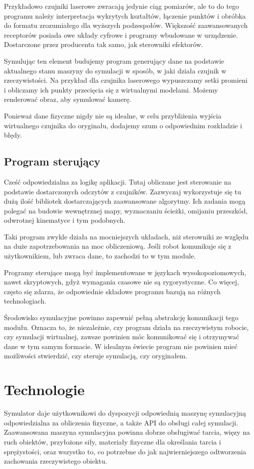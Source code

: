 	Przykładowo czujniki laserowe zwracają jedynie ciąg pomiarów, ale to do tego programu należy interpretacja wykrytych kształtów, łączenie punktów i obróbka do formatu zrozumiałego dla wyższych podzespołów.
	Większość zaawansowanych receptorów posiada owe układy cyfrowe i programy wbudowane w urządzenie.
	Dostarczone przez producenta tak samo, jak sterowniki efektorów.
	
	Symulując ten element budujemy program generujący dane na podstawie aktualnego stanu maszyny do symulacji w sposób, w jaki działa czujnik w rzeczywistości.
	Na przykład dla czujnika laserowego wypuszczamy setki promieni i obliczamy ich punkty przecięcia się z wirtualnymi modelami.
	Możemy renderować obraz, aby symulować kamerę.

	Ponieważ dane fizyczne nigdy nie są idealne, w celu przybliżenia wyjścia wirtualnego czujnika do oryginału, dodajemy szum o odpowiednim rozkładzie i błędy.

	\subsection{Program sterujący}
	Cześć odpowiedzialna za logikę aplikacji. Tutaj obliczane jest sterowanie na podstawie dostarczonych odczytów z czujników.
	Zazwyczaj wykorzystuje się tu dużą ilość bibliotek dostarczających zaawansowane algorytmy.
	Ich zadania mogą polegać na budowie wewnętrznej mapy, wyznaczaniu ścieżki, omijaniu przeszkód, odwrotnej kinematyce i tym podobnych.

	Taki program zwykle działa na mocniejszych układach, niż sterowniki ze względu na duże zapotrzebowania na moc obliczeniową.
	Jeśli robot komunikuje się z użytkownikiem, lub zwraca dane, to zachodzi to w tym module. 

	Programy sterujące mogą być implementowane w językach wysokopoziomowych, nawet skryptowych, gdyż wymagania czasowe nie są rygorystyczne.
	Co więcej, często się zdarza, że odpowiednie składowe programu bazują na różnych technologiach.

	Środowisko symulacyjne powinno zapewnić pełną abstrakcję komunikacji tego modułu.
	Oznacza to, że niezależnie, czy program działa na rzeczywistym robocie, czy symulacji wirtualnej, zawsze powinien móc komunikować się i otrzymywać dane w tym samym formacie.
	W idealnym świecie program nie powinien mieć możliwości stwierdzić, czy steruje symulacją, czy oryginałem.

\section{Technologie}
	Symulator daje użytkownikowi do dyspozycji odpowiednią maszynę symulacyjną odpowiedzialna za obliczenia fizyczne, a także API do obsługi całej symulacji.
	Zaawansowana maszyna symulacyjna powinna dobrze obsługiwać tarcia, więzy na ruch obiektów, przyłożone siły, materiały fizyczne dla określania tarcia i sprężystości, 
	oraz wszystko to, co potrzebne do jak najwierniejszego odtworzenia zachowania rzeczywistego obiektu.

